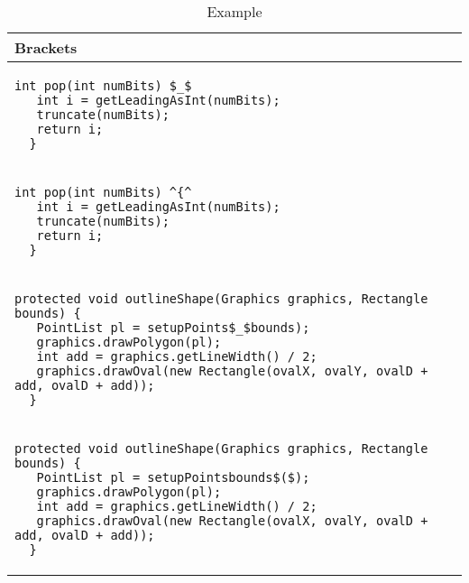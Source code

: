 \begin{table}[p]
\begin{tabular}{ | m{11cm} | }
  \hline
  Brackets \\
  \hline
  {\begin{lstlisting}[style=table]
  int pop(int numBits) $_$
   int i = getLeadingAsInt(numBits);
   truncate(numBits);
   return i;
  }
  \end{lstlisting}} \\
  {\begin{lstlisting}[style=table]
  int pop(int numBits) ^{^
   int i = getLeadingAsInt(numBits);
   truncate(numBits);
   return i;
  }
  \end{lstlisting}} \\
  \hline
  \hline
  {\begin{lstlisting}[style=table]
  protected void outlineShape(Graphics graphics, Rectangle bounds) {
   PointList pl = setupPoints$_$bounds);
   graphics.drawPolygon(pl);
   int add = graphics.getLineWidth() / 2;
   graphics.drawOval(new Rectangle(ovalX, ovalY, ovalD + add, ovalD + add));
  }
  \end{lstlisting}} \\
  {\begin{lstlisting}[style=table]
  protected void outlineShape(Graphics graphics, Rectangle bounds) {
   PointList pl = setupPointsbounds$($);
   graphics.drawPolygon(pl);
   int add = graphics.getLineWidth() / 2;
   graphics.drawOval(new Rectangle(ovalX, ovalY, ovalD + add, ovalD + add));
  }
  \end{lstlisting}} \\
  \hline
\end{tabular}
\caption{Example}
\label{brackets_showcase_table}
\end{table}

